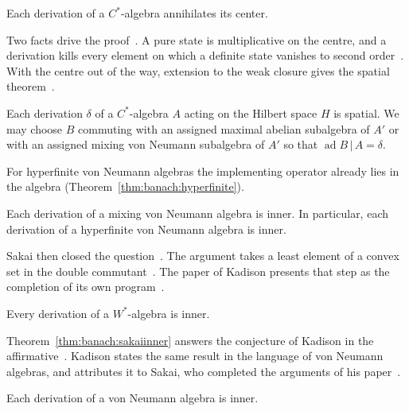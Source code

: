 \begin{theorem}\label{thm:banach:center}
Each derivation of a $C^*$-algebra annihilates its center.
\end{theorem}

Two facts drive the proof~\cite[p.~281]{Kadison1966}. A pure state is
multiplicative on the centre, and a derivation kills every element on which a
definite state vanishes to second order~\cite[p.~281]{Kadison1966}. With the centre out of the way,
extension to the weak closure gives the spatial
theorem~\cite[p.~281]{Kadison1966}.

\begin{theorem}\label{thm:banach:spatial}
Each derivation $\delta$ of a $C^*$-algebra $A$ acting on the Hilbert space
$H$ is spatial. We may choose $B$ commuting with an assigned maximal
abelian subalgebra of $A'$ or with an assigned mixing von Neumann
subalgebra of $A'$ so that $\operatorname{ad} B\,\vert\,A=\delta$.
\end{theorem}

For hyperfinite von Neumann algebras the implementing operator already lies
in the algebra (Theorem~\ref{thm:banach:hyperfinite}).

\begin{theorem}\label{thm:banach:hyperfinite}
Each derivation of a mixing von Neumann algebra is inner. In particular,
each derivation of a hyperfinite von Neumann algebra is inner.
\end{theorem}

Sakai then closed the question~\cite[p.~274]{Sakai1966}. The argument takes a least element of a
convex set in the double commutant~\cite[p.~290]{Kadison1966}. The paper of
Kadison presents that step as the completion of its own
program~\cite[p.~290]{Kadison1966}.

\begin{theorem}\label{thm:banach:sakaiinner}
Every derivation of a $W^*$-algebra is inner.
\end{theorem}

Theorem~\ref{thm:banach:sakaiinner} answers the conjecture of Kadison in the
affirmative~\cite[p.~274]{Sakai1966}. Kadison states the same result in the
language of von Neumann algebras, and attributes it to Sakai, who completed
the arguments of his paper~\cite[Theorem~15, p.~290]{Kadison1966}.

\begin{theorem}\label{thm:banach:kadison-inner}
Each derivation of a von Neumann algebra is inner.
\end{theorem}


